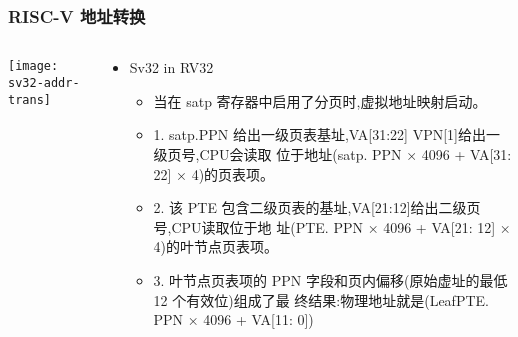 \begin{frame} 
\frametitle{RISC-V 地址转换}

\begin{columns}
	
	\begin{column}{.4\textwidth}
		
		\texttt{[image: sv32-addr-trans]}
		
	\end{column}
	
	
	\begin{column}{.6\textwidth}
		
		\begin{itemize}
			\item Sv32 in RV32
			\begin{itemize}
				\item 当在 satp 寄存器中启用了分页时,虚拟地址映射启动。
				 \item 1. satp.PPN 给出一级页表基址,VA[31:22] VPN[1]给出一级页号,CPU会读取
				位于地址(satp. PPN × 4096 + VA[31: 22] × 4)的页表项。 \pause
				\item 2. 该 PTE 包含二级页表的基址,VA[21:12]给出二级页号,CPU读取位于地
				址(PTE. PPN × 4096 + VA[21: 12] × 4)的叶节点页表项。  \pause
				\item 3. 叶节点页表项的 PPN 字段和页内偏移(原始虚址的最低 12 个有效位)组成了最
				终结果:物理地址就是(LeafPTE. PPN × 4096 + VA[11: 0])
				
			\end{itemize}
		\end{itemize}
		
		
		
	\end{column}
	
	
\end{columns}
\end{frame}

%	
%		
%			
%		
%		
%			
%			
%		
%		


